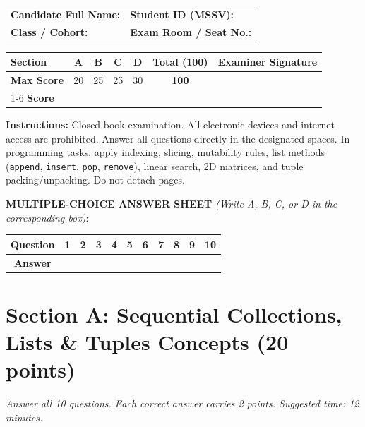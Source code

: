 \documentclass[11pt,a4paper]{article}
\begin{document}
\begin{headerbox}
\begin{tabular*}{\textwidth}{@{\extracolsep{\fill}}ll@{}}
  \textbf{Candidate Full Name:} \dotfill & \textbf{Student ID (MSSV):} \dotfill \\[0.2em]
  \textbf{Class / Cohort:} \dotfill & \textbf{Exam Room / Seat No.:} \dotfill
\end{tabular*}

\vspace{0.2em}
\renewcommand{\arraystretch}{1.05}
\setlength{\tabcolsep}{4.5pt}
\centering
\begin{tabular}{|l|c|c|c|c||c|c|}
\hline
\textbf{Section} & \textbf{A} & \textbf{B} & \textbf{C} & \textbf{D} & \textbf{Total (100)} & \textbf{Examiner Signature} \\
\hline
\textbf{Max Score} & 20 & 25 & 25 & 30 & \textbf{100} & \\[0.3em]
\cline{1-6}
\textbf{Score} & & & & & & \\[0.4em]
\hline
\end{tabular}

\vspace{0.15em}
\raggedright
\scriptsize
\textbf{Instructions:} Closed-book examination. All electronic devices and internet access are prohibited. Answer all questions directly in the designated spaces. In programming tasks, apply indexing, slicing, mutability rules, list methods (\texttt{append}, \texttt{insert}, \texttt{pop}, \texttt{remove}), linear search, 2D matrices, and tuple packing/unpacking. Do not detach pages.
\end{headerbox}

\vspace{1mm}
\noindent
\textbf{MULTIPLE-CHOICE ANSWER SHEET} \textit{(Write A, B, C, or D in the corresponding box)}:
\begin{center}
\setlength{\tabcolsep}{5pt}
\renewcommand{\arraystretch}{1.0}
\begin{tabular}{|c|c|c|c|c|c|c|c|c|c|c|}
\hline
\textbf{Question} & \textbf{1} & \textbf{2} & \textbf{3} & \textbf{4} & \textbf{5} & \textbf{6} & \textbf{7} & \textbf{8} & \textbf{9} & \textbf{10} \\
\hline
\textbf{Answer} & & & & & & & & & & \\[1.8mm]
\hline
\end{tabular}
\end{center}
\vspace{-2.5mm}
\section*{Section A: Sequential Collections, Lists \& Tuples Concepts \hfill \normalsize\normalfont(20 points)}
\textit{Answer all 10 questions. Each correct answer carries 2 points. Suggested time: 12 minutes.}
\end{document}
